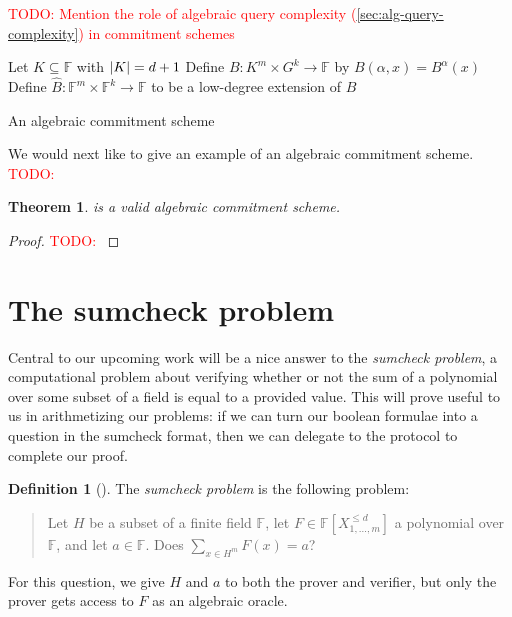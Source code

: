 \documentclass[english,12pt]{reedthesis}
\theoremstyle{plain}
\newtheorem{thm}{Theorem}[section]
\theoremstyle{definition}
\newtheorem{defn}[defn]{Definition}
\theoremstyle{remark}
\DeclarePairedDelimiter{\abs}{\lvert}{\rvert}
\newcommand{\TODO}[1]{\textcolor{red}{TODO: #1}}
\begin{document}
\TODO{Mention the role of algebraic query complexity
  (\cref{sec:alg-query-complexity}) in commitment schemes}

\begin{algorithm}[htbp]
  Let $K \subseteq \mathbb{F}$ with $\abs{K} = d + 1$\;
  Define $B\colon K^{m} \times G^{k} \rightarrow \mathbb{F}$ by $B(\alpha, x) = B^{\alpha}(x)$\;
  Define $\hat{B}\colon \mathbb{F}^{m} \times \mathbb{F}^{k} \rightarrow \mathbb{F}$ to be a
  low-degree extension of
  $B$
  \;
  \caption{An algebraic commitment scheme~\cite[]{CFGS22}}\label{alg:alg-commit-scheme}
\end{algorithm}

We would next like to give an example of an algebraic commitment scheme. \TODO{}

\begin{thm}\label{thm:alg-commit-scheme}
   is a valid algebraic commitment scheme.
\end{thm}

\begin{proof}
  \TODO{}
\end{proof}

\section{The sumcheck problem}

Central to our upcoming work will be a nice answer to the \emph{sumcheck
  problem}, a computational problem about verifying whether or not the sum of a
polynomial over some subset of a field is equal to a provided value. This will
prove useful to us in arithmetizing our problems: if we can turn our boolean
formulae into a question in the sumcheck format, then we can delegate to the
protocol to complete our proof.

\begin{defn}[{\cite{LFKN92}}]\label{def:sumcheck}
  The \emph{sumcheck problem} is the following problem:
  \begin{quote}
    Let $H$ be a subset of a finite field $\mathbb{F}$, let
    $F \in \mathbb{F}[X_{1, \ldots, m}^{\le d}]$ a polynomial over $\mathbb{F}$, and let
    $a \in \mathbb{F}$. Does $\sum_{x \in H^{m}}F(x) = a$?
  \end{quote}
  For this question, we give $H$ and $a$ to both the prover and verifier, but
  only the prover gets access to $F$ as an algebraic oracle.
\end{defn}
\end{document}
